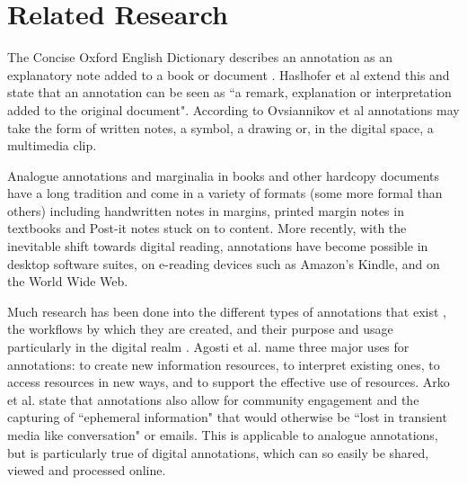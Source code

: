 
\chapter{Related Research} %

\label{Chapter3} %




The Concise Oxford English Dictionary describes an annotation as an explanatory note added to a book or document \citep{OxfordDict}. Haslhofer et al \citep{LEMO} extend this and state that an annotation can be seen as ``a remark, explanation or interpretation added to the original document". According to Ovsiannikov et al \citep{Ovsiannikov} annotations may take the form of written notes, a symbol, a drawing or, in the digital space, a multimedia clip. 

Analogue annotations and marginalia in books and other hardcopy documents have a long tradition \citep{LEMO} and come in a variety of formats (some more formal than others) including handwritten notes in margins, printed margin notes in textbooks and Post-it notes stuck on to content. More recently, with the inevitable shift towards digital reading, annotations have become possible in desktop software suites, on e-reading devices such as Amazon's Kindle, and on the World Wide Web. 

Much research has been done into the different types of annotations that exist \citep{Marshall2000} \citep{Marshall2004}, the workflows by which they are created, and their purpose and usage  particularly in the digital realm \citep{Agosti} \citep{Ovsiannikov}. Agosti et al. \citep{Agosti} name three major uses for annotations: to create new information resources, to interpret existing ones, to access resources in new ways, and to support the effective use of resources.  Arko et al. \citep{Arko} state that annotations also allow for community engagement and the capturing of ``ephemeral information" that would otherwise be ``lost in transient media like conversation" or emails. This is applicable to analogue annotations, but is particularly true of digital annotations, which can so easily be shared, viewed and processed online.

